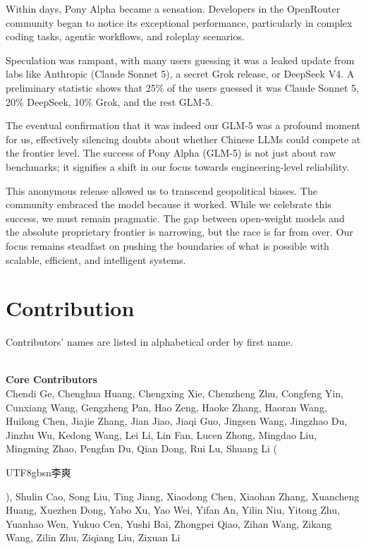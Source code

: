 \documentclass{article}
\theoremstyle{definition}
\begin{document}
Within days, Pony Alpha became a sensation. Developers in the OpenRouter community began to notice its exceptional performance, particularly in complex coding tasks, agentic workflows, and roleplay scenarios.

Speculation was rampant, with many users guessing it was a leaked update from labs like Anthropic (Claude Sonnet 5), a secret Grok release, or DeepSeek V4. A preliminary statistic shows that 25\% of the users guessed it was Claude Sonnet 5, 20\% DeepSeek, 10\% Grok, and the rest GLM-5.

The eventual confirmation that it was indeed our GLM-5 was a profound moment for us, effectively silencing doubts about whether Chinese LLMs could compete at the frontier level. 
The success of Pony Alpha (GLM-5) is not just about raw benchmarks; it signifies a shift in our focus towards engineering-level reliability.

This anonymous release allowed us to transcend geopolitical biases. The community embraced the model because it worked.
While we celebrate this success, we must remain pragmatic. The gap between open-weight models and the absolute proprietary frontier is narrowing, but the race is far from over. Our focus remains steadfast on pushing the boundaries of what is possible with scalable, efficient, and intelligent systems.
\newpage
\section{Contribution}
\label{sec:contribution}
\newcommand{\cpara}[1]{~\\\textbf{#1}~\\}
Contributors' names are listed in alphabetical order by first name. 

\cpara{Core Contributors}

Chendi Ge, Chenghua Huang, Chengxing Xie, Chenzheng Zhu, Congfeng Yin, Cunxiang Wang, Gengzheng Pan, Hao Zeng, Haoke Zhang, Haoran Wang, Huilong Chen, Jiajie Zhang, Jian Jiao, Jiaqi Guo, Jingsen Wang, Jingzhao Du, Jinzhu Wu, Kedong Wang, Lei Li, Lin Fan, Lucen Zhong, Mingdao Liu, Mingming Zhao, Pengfan Du, Qian Dong, Rui Lu, Shuang Li (\begin{CJK*}{UTF8}{gbsn}李爽\end{CJK*}), Shulin Cao, Song Liu, Ting Jiang, Xiaodong Chen, Xiaohan Zhang, Xuancheng Huang, Xuezhen Dong, Yabo Xu, Yao Wei, Yifan An, Yilin Niu, Yitong Zhu, Yuanhao Wen, Yukuo Cen, Yushi Bai, Zhongpei Qiao, Zihan Wang, Zikang Wang, Zilin Zhu, Ziqiang Liu, Zixuan Li
\end{document}
